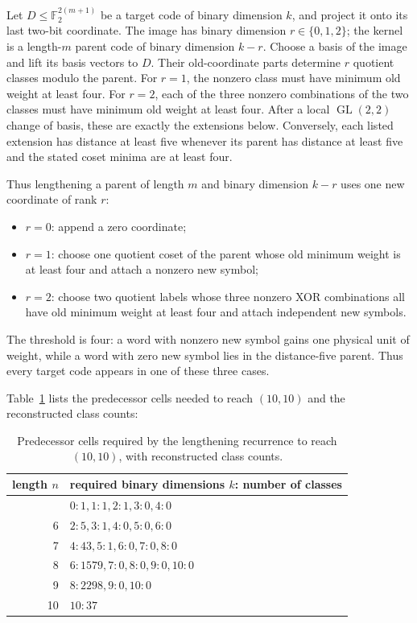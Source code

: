 \documentclass[11pt]{article}
\providecommand{\tightlist}{\setlength{\itemsep}{0pt}\setlength{\parskip}{0pt}}
\begin{document}
Let \(D\leq\mathbb{F}_2^{2(m+1)}\) be a target code of binary dimension \(k\), and project it onto its last two-bit coordinate. The image has binary dimension \(r\in\{0,1,2\}\); the kernel is a length-\(m\) parent code of binary dimension \(k-r\). Choose a basis of the image and lift its basis vectors to \(D\). Their old-coordinate parts determine \(r\) quotient classes modulo the parent. For \(r=1\), the nonzero class must have minimum old weight at least four. For \(r=2\), each of the three nonzero combinations of the two classes must have minimum old weight at least four. After a local \(\operatorname{GL}(2,2)\) change of basis, these are exactly the extensions below. Conversely, each listed extension has distance at least five whenever its parent has distance at least five and the stated coset minima are at least four.

Thus lengthening a parent of length \(m\) and binary dimension \(k-r\) uses one new coordinate of rank \(r\):

\begin{itemize}
\tightlist
\item
  \(r=0\): append a zero coordinate;
\item
  \(r=1\): choose one quotient coset of the parent whose old minimum weight is at least four and attach a nonzero new symbol;
\item
  \(r=2\): choose two quotient labels whose three nonzero XOR combinations all have old minimum weight at least four and attach independent new symbols.
\end{itemize}

The threshold is four: a word with nonzero new symbol gains one physical unit of weight, while a word with zero new symbol lies in the distance-five parent. Thus every target code appears in one of these three cases.

Table~\ref{tab:predecessors} lists the predecessor cells needed to reach \((10,10)\) and the reconstructed class counts:

{
\begin{longtable}[]{@{}rl@{}}
\caption{Predecessor cells required by the lengthening recurrence to reach \((10,10)\), with reconstructed class counts.}
\label{tab:predecessors}\\
\toprule\noalign{}
length \(n\) & required binary dimensions \(k\): number of classes \\
\midrule\noalign{}
\endhead
\bottomrule\noalign{}
\endlastfoot
5 & \(0:1, 1:1, 2:1, 3:0, 4:0\) \\
6 & \(2:5, 3:1, 4:0, 5:0, 6:0\) \\
7 & \(4:43, 5:1, 6:0, 7:0, 8:0\) \\
8 & \(6:1579, 7:0, 8:0, 9:0, 10:0\) \\
9 & \(8:2298, 9:0, 10:0\) \\
10 & \(10:37\) \\
\end{longtable}
}
\end{document}

